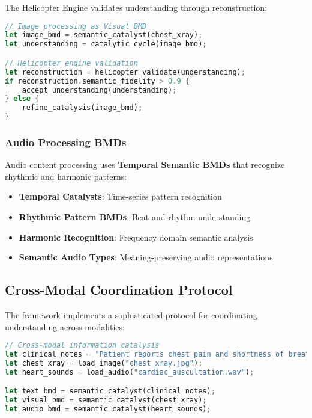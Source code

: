 \documentclass[12pt,a4paper,twoside]{article}
\begin{document}
\begin{itemize}
The Helicopter Engine validates understanding through reconstruction:

\begin{lstlisting}[language=rust,caption=Visual BMD Architecture]
// Image processing as Visual BMD
let image_bmd = semantic_catalyst(chest_xray);
let understanding = catalytic_cycle(image_bmd);

// Helicopter engine validation
let reconstruction = helicopter_validate(understanding);
if reconstruction.semantic_fidelity > 0.9 {
    accept_understanding(understanding);
} else {
    refine_catalysis(image_bmd);
}
\end{lstlisting}

\subsubsection{Audio Processing BMDs}

Audio content processing uses \textbf{Temporal Semantic BMDs} that recognize rhythmic and harmonic patterns:

\begin{itemize}
\item \textbf{Temporal Catalysts}: Time-series pattern recognition
\item \textbf{Rhythmic Pattern BMDs}: Beat and rhythm understanding
\item \textbf{Harmonic Recognition}: Frequency domain semantic analysis
\item \textbf{Semantic Audio Types}: Meaning-preserving audio representations
\end{itemize}

\subsection{Cross-Modal Coordination Protocol}

The framework implements a sophisticated protocol for coordinating understanding across modalities:

\begin{lstlisting}[language=rust,caption=Cross-Modal BMD Coordination]
// Cross-modal information catalysis
let clinical_notes = "Patient reports chest pain and shortness of breath";
let chest_xray = load_image("chest_xray.jpg");
let heart_sounds = load_audio("cardiac_auscultation.wav");

let text_bmd = semantic_catalyst(clinical_notes);
let visual_bmd = semantic_catalyst(chest_xray);
let audio_bmd = semantic_catalyst(heart_sounds);


\end{lstlisting}
\end{itemize}
\end{document}
